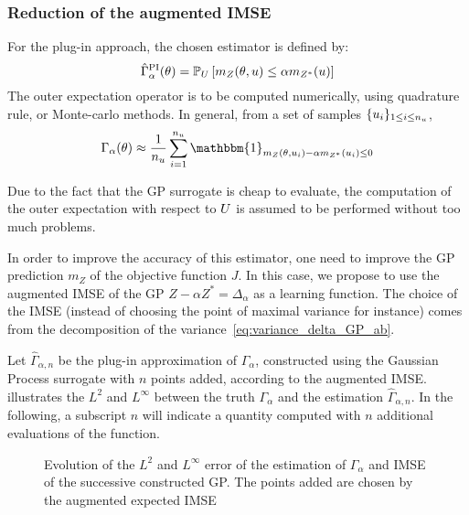 \documentclass[../../Main_ManuscritThese.tex]{subfiles}
\newcommand\imgpath{/home/victor/acadwriting/Manuscrit/Text/Chapter4/img/}
\begin{document}
\subsubsection{Reduction of the augmented IMSE}
For the plug-in approach, the chosen estimator is defined by:
\begin{equation}
  \label{eq:def_gamma_PI}
  \hat{\Gamma}_{\alpha}^{\mathrm{PI}}(\theta) = \mathbb{P}_U\left[m_Z(\theta,u) \leq \alpha m_{{Z^*}}(u) \right]
\end{equation}
The outer expectation operator is to be computed numerically, using
quadrature rule, or Monte-carlo methods. In general, from a set of
samples $\{u_i\}_{1\leq i \leq n_{u}}$,
\begin{equation}
  \Gamma_{\alpha}(\kk) \approx \frac{1}{n_{\uu}}\sum_{i=1}^{n_{\uu}} \mathbbm{1}_{m_Z(\kk, \uu_i) - \alpha m_{Z^*}(\uu_i)\leq 0}
\end{equation}

Due to the fact that the GP surrogate is cheap to evaluate, the
computation of the outer expectation with respect to $U$ is
assumed to be performed without too much problems.

In order to improve the accuracy of this estimator, one need to
improve the GP prediction $m_Z$ of the objective function $J$.
In this case, we propose to use the augmented IMSE of the GP
$Z - \alpha Z^* = \Delta_{\alpha}$ %
as a learning function. The choice of the IMSE
(instead of choosing the point of maximal variance for instance) comes
from the decomposition of the variance~\cref{eq:variance_delta_GP_ab}.


Let $\hat{\Gamma}_{\alpha,n}$ be the plug-in approximation of
$\Gamma_\alpha$, constructed using the Gaussian Process surrogate with
$n$ points added, according to the augmented
IMSE.~ illustrates the $L^2$ and
$L^{\infty}$ between the truth $\Gamma_\alpha$ and the estimation
$\hat{\Gamma}_{\alpha,n}$. In the following, a subscript $n$ will
indicate a quantity computed with $n$ additional evaluations of the
function.

\begin{figure}[ht]
  \centering
  
  \caption[Augmented IMSE for the estimation of
  $\Gamma_{\alpha}$]{\label{fig:IMSE_enrichment} Evolution of the
    $L^2$ and $L^\infty$ error of the estimation of $\Gamma_\alpha$
    and IMSE of the successive constructed GP. The points added are
    chosen by the augmented expected IMSE}
\end{figure}
\end{document}
